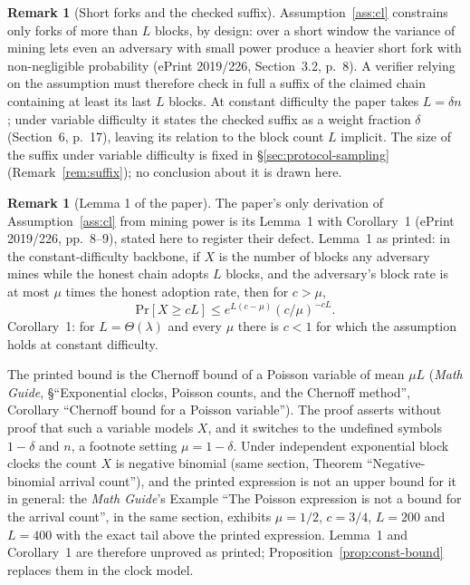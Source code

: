 \documentclass[11pt,a4paper]{article}
\theoremstyle{definition}
\newtheorem{remark}[theorem]{Remark}
\renewcommand{\Pr}{\mathrm{Pr}}
\begin{document}
\begin{remark}[Short forks and the checked suffix]\label{rem:short-forks}
Assumption~\ref{ass:cl} constrains only forks of more than $L$ blocks, by
design: over a short window the variance of mining lets even an adversary
with small power produce a heavier short fork with non-negligible
probability (ePrint 2019/226, Section~3.2, p.~8). A verifier relying on the
assumption must therefore check in full a suffix of the claimed chain
containing at least its last $L$ blocks. At constant difficulty the paper
takes $L = \delta n$; under variable difficulty it states the checked suffix
as a weight fraction $\delta$ (Section~6, p.~17), leaving its relation to
the block count $L$ implicit. The size of the suffix under variable
difficulty is fixed in \S\ref{sec:protocol-sampling}
(Remark~\ref{rem:suffix}); no conclusion about it is drawn here.
\end{remark}

\begin{remark}[Lemma 1 of the paper]\label{rem:lemma1}
The paper's only derivation of Assumption~\ref{ass:cl} from mining power is
its Lemma~1 with Corollary~1 (ePrint 2019/226, pp.~8--9), stated here to
register their defect. Lemma~1 as printed: in the constant-difficulty
backbone, if $X$ is the number of blocks any adversary mines while the
honest chain adopts $L$ blocks, and the adversary's block rate is at most
$\mu$ times the honest adoption rate, then for $c > \mu$,
\[
  \Pr[X \ge cL] \le e^{L(c - \mu)} (c / \mu)^{-cL} .
\]
Corollary~1: for $L = \Theta(\lambda)$ and every $\mu$ there is $c < 1$ for
which the assumption holds at constant difficulty.

The printed bound is the Chernoff bound of a Poisson variable of mean
$\mu L$ (\emph{Math Guide}, \S``Exponential clocks, Poisson counts, and the Chernoff method'', Corollary ``Chernoff bound for a
Poisson variable''). The proof asserts without proof that such a variable
models $X$, and it switches to the undefined symbols $1 - \delta$ and $n$, a
footnote setting $\mu = 1 - \delta$. Under independent exponential block
clocks the count $X$ is negative binomial (same section, Theorem
``Negative-binomial arrival count''), and the printed expression is not an
upper bound for it in general: the \emph{Math Guide}'s Example ``The Poisson
expression is not a bound for the arrival count'', in the same section,
exhibits $\mu = 1/2$, $c = 3/4$, $L = 200$ and $L = 400$ with the exact tail
above the printed expression. Lemma~1 and Corollary~1 are therefore
unproved as printed; Proposition~\ref{prop:const-bound} replaces them in the
clock model.
\end{remark}
\end{document}
